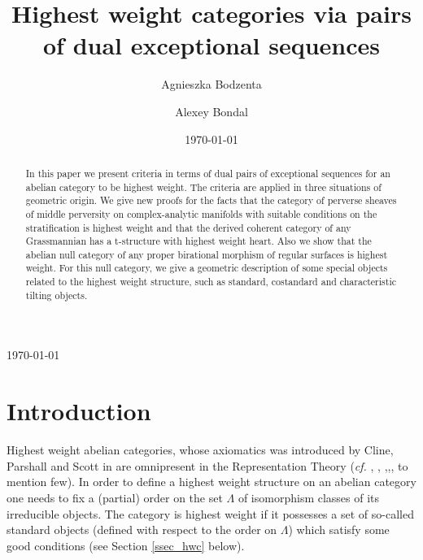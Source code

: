 \documentclass[12pt,a4paper]{amsart}
\theoremstyle{definition}
\begin{document}
\title{Highest weight categories via pairs of dual exceptional sequences}

\today
	\author{Agnieszka Bodzenta}
\author{Alexey Bondal}
\date{\today}

\address{Agnieszka Bodzenta\\
	Institute of Mathematics, 
	University of Warsaw \\ Banacha 2 \\ Warsaw 02-097,
	Poland} 

\address{Alexey Bondal\\
	Steklov Mathematical Institute of Russian Academy of Sciences, Moscow, Russia, and \\
	Centre for Pure Mathematics, Moscow Institute of Physics and Technology, Russia, and\\
	Kavli Institute for the Physics and Mathematics of the Universe (WPI), The University of Tokyo, Kashiwa, Chiba 277-8583, Japan} 

	
	\begin{abstract}
In this paper we present criteria in terms of dual pairs of exceptional sequences for an abelian category to be highest weight. The criteria are applied in three situations of geometric origin. We give new proofs for the facts that the category of perverse sheaves of middle perversity on complex-analytic manifolds with suitable conditions on the stratification is highest weight and that the derived coherent category of any Grassmannian has a t-structure with highest weight heart. Also we show that the abelian null category of any proper birational morphism of regular surfaces is highest weight. For this null category, we give a geometric description of some special objects related to the highest weight structure, such as standard, costandard and characteristic tilting objects. 
\end{abstract}
	\maketitle
	\tableofcontents
	
	\section{Introduction}
	
	Highest weight abelian categories, whose axiomatics was introduced by Cline, Parshall and Scott in \cite{CPS} are omnipresent in the Representation Theory ({\it cf.} \cite{ParSco}, \cite{DR}, \cite{Donkin1},\cite{Rou4},\cite{BrunStrop}, to mention few). In order to define a highest weight structure on an abelian category one needs to fix a (partial) order on the set $\Lambda$ of isomorphism classes of its irreducible objects. The category is highest weight if it possesses a set of so-called standard objects (defined with respect to the order on $\Lambda$) which satisfy some good conditions (see Section \ref{ssec_hwc} below).  
	
\end{document}
